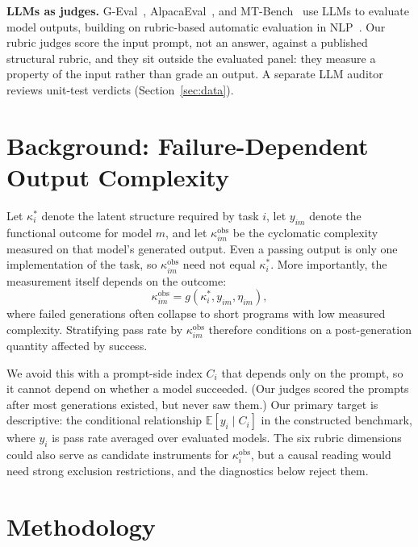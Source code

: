 \documentclass{article}
\begin{document}
\textbf{LLMs as judges.} G-Eval~\cite{liu2023geval}, AlpacaEval~\cite{alpacaeval}, and MT-Bench~\cite{zheng2023judging} use LLMs to evaluate model outputs, building on rubric-based automatic evaluation in NLP~\cite{hashimoto2019unifying}. Our rubric judges score the input prompt, not an answer, against a published structural rubric, and they sit outside the evaluated panel: they measure a property of the input rather than grade an output. A separate LLM auditor reviews unit-test verdicts (Section~\ref{sec:data}).

\section{Background: Failure-Dependent Output Complexity}

Let $\kappa_i^*$ denote the latent structure required by task $i$, let $y_{im}$ denote the functional outcome for model $m$, and let $\kappa_{im}^{\mathrm{obs}}$ be the cyclomatic complexity measured on that model's generated output. Even a passing output is only one implementation of the task, so $\kappa_{im}^{\mathrm{obs}}$ need not equal $\kappa_i^*$. More importantly, the measurement itself depends on the outcome:
\begin{equation}
\kappa_{im}^{\mathrm{obs}} = g(\kappa_i^*, y_{im}, \eta_{im}),
\label{eq:failure-dependent}
\end{equation}
where failed generations often collapse to short programs with low measured complexity. Stratifying pass rate by $\kappa_{im}^{\mathrm{obs}}$ therefore conditions on a post-generation quantity affected by success.

We avoid this with a prompt-side index $C_i$ that depends only on the prompt, so it cannot depend on whether a model succeeded. (Our judges scored the prompts after most generations existed, but never saw them.) Our primary target is descriptive: the conditional relationship $\mathbb{E}[y_i\mid C_i]$ in the constructed benchmark, where $y_i$ is pass rate averaged over evaluated models. The six rubric dimensions could also serve as candidate instruments for $\kappa_i^{\mathrm{obs}}$, but a causal reading would need strong exclusion restrictions, and the diagnostics below reject them.
\section{Methodology}
\end{document}
